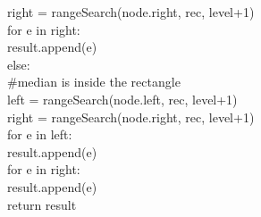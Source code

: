 \documentclass[english, fontsize=12pt, paper=a4, twoside=false, draft=true, pagesize=auto, version=last, DIV=16]{scrartcl}
\theoremstyle{break}
\begin{document}
\hspace*{10mm}\hspace*{10mm}\hspace*{10mm}right = rangeSearch(node.right, rec, level+1)\\
\hspace*{10mm}\hspace*{10mm}\hspace*{10mm}for e in right:\\
\hspace*{10mm}\hspace*{10mm}\hspace*{10mm}\hspace*{10mm}result.append(e)\\
\hspace*{10mm}\hspace*{10mm}else:\\
\hspace*{10mm}\hspace*{10mm}\hspace*{10mm}\#median is inside the rectangle\\
\hspace*{10mm}\hspace*{10mm}\hspace*{10mm}left = rangeSearch(node.left, rec, level+1)\\
\hspace*{10mm}\hspace*{10mm}\hspace*{10mm}right = rangeSearch(node.right, rec, level+1)\\
\hspace*{10mm}\hspace*{10mm}\hspace*{10mm}for e in left:\\
\hspace*{10mm}\hspace*{10mm}\hspace*{10mm}\hspace*{10mm}result.append(e)\\
\hspace*{10mm}\hspace*{10mm}\hspace*{10mm}for e in right:\\
\hspace*{10mm}\hspace*{10mm}\hspace*{10mm}\hspace*{10mm}result.append(e)\\
\hspace*{10mm}return result\\
\end{document}
